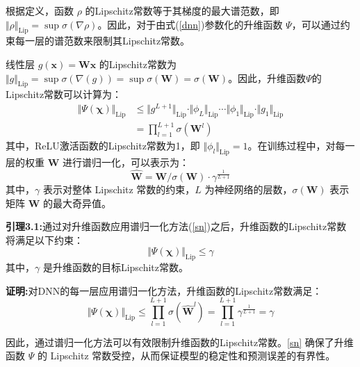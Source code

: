 \documentclass[lang=chs, degree=master, blindreview=false, winfonts=true]{yanputhesis}
\begin{document}
根据定义，函数 $\rho$ 的Lipschitz常数等于其梯度的最大谱范数，即 $\Vert \rho \Vert_{\text{Lip}} = \sup \sigma (\nabla \rho)$。因此，对于由式(\ref{dnn})参数化的升维函数 ${\Psi}$，可以通过约束每一层的谱范数来限制其Lipschitz常数。

线性层 $g(\bm{x})=\bm{W}\bm{x}$ 的Lipschitz常数为 $\Vert g \Vert_{\text{Lip}} = \sup \sigma(\nabla(g))=\sup \sigma(\bm{W})=\sigma(\bm{W})$。因此，升维函数${\Psi}$的Lipschitz常数可以计算为：
\begin{equation}
    \begin{aligned}
	\Vert {\Psi}(\bm{\chi}) \Vert_{\text{Lip}} &\le \Vert g^{L+1} \Vert_{\text{Lip}} \cdot \Vert \phi_L \Vert_{\text{Lip}} \cdots \Vert \phi_1 \Vert_{\text{Lip}} \cdot \Vert g_1 \Vert_{\text{Lip}} \\
	&= \prod_{l=1}^{L+1}\sigma(\bm{W}^l)
\end{aligned}
\end{equation}
其中，ReLU激活函数的Lipschitz常数为1，即 $\Vert \phi_l \Vert_{\text{Lip}} = 1$。在训练过程中，对每一层的权重 $\bm{W}$ 进行谱归一化，可以表示为：
\begin{equation}
    \hat{\bm{W}} = \bm{W} / \sigma(\bm{W}) \cdot \gamma ^{\frac{1}{L+1}}  
	\label{sn}
\end{equation}
其中，$\gamma$ 表示对整体 Lipschitz 常数的约束，$L$ 为神经网络的层数，$\sigma(\bm{W})$ 表示矩阵 $\bm{W}$ 的最大奇异值。

\textbf{引理3.1:}通过对升维函数应用谱归一化方法(\ref{sn})之后，升维函数的Lipschitz常数将满足以下约束：
\begin{equation}
	\Vert {\Psi}(\bm{\chi}) \Vert_{\text{Lip}}\le \gamma
\end{equation}
其中，$\gamma$ 是升维函数的目标Lipschitz常数。

\textbf{证明:}对DNN的每一层应用谱归一化方法，升维函数的Lipschitz常数满足：
\begin{equation}
	\Vert {\Psi}(\bm{\chi}) \Vert_{\text{Lip}} \le \prod_{l=1}^{L+1}\sigma(\hat{\bm{W}}^l) = \prod_{l=1}^{L+1}\gamma^{\frac{1}{L+1}}=\gamma
\end{equation}

因此，通过谱归一化方法可以有效限制升维函数的Lipschitz常数。\autoref{sn} 确保了升维函数 $\Psi$ 的 Lipschitz 常数受控，从而保证模型的稳定性和预测误差的有界性。

\end{document}
